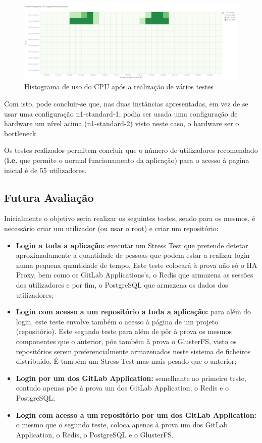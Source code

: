 \documentclass{article}
\begin{document}
\begin{figure}[H]
    \centering
    \includegraphics[width=15cm]{histCPU.png}
    \caption{Histograma de uso do CPU após a realização de vários testes}
\end{figure}

Com isto, pode concluir-se que, nas duas instâncias apresentadas, em vez de se usar uma configuração n1-standard-1, podia ser usada uma configuração de hardware um nível acima (n1-standard-2) visto neste caso, o hardware ser o bottleneck.

Os testes realizados permitem concluir que o número de utilizadores recomendado (\textbf{i.e.} que permite o normal funcionamento da aplicação) para o acesso à pagina inicial é de 55 utilizadores.

\subsection{Futura Avaliação}
Inicialmente o objetivo seria realizar os seguintes testes, sendo para os mesmos, é necessário criar um utilizador (ou usar o root) e criar um repositório:
\begin{itemize}
    \item \textbf{Login a toda a aplicação:} executar um Stress Test que pretende detetar aproximadamente a quantidade de pessoas que podem estar a realizar login numa pequena quantidade de tempo. Este teste colocará à prova não só o HA Proxy, bem como os GitLab Applications's, o Redis que armazena as sessões dos utilizadores e por fim, o PostgreSQL que armazena os dados dos utilizadores;
    \item \textbf{Login com acesso a um repositório a toda a aplicação:} para além do login, este teste envolve também o acesso à página de um projeto (repositório). Este segundo teste para além de pôr à prova os mesmos componentes que o anterior, põe também à prova o GlusterFS, visto os repositórios serem preferencialmente armazenados neste sistema de ficheiros distribuído. É também um Stress Test mas mais pesado que o anterior;
    \item \textbf{Login por um dos GitLab Application:} semelhante ao primeiro teste, contudo apenas põe à prova um dos GitLab Application, o Redis e o PostgreSQL;
    \item \textbf{Login com acesso a um repositório por um dos GitLab Application:} o mesmo que o segundo teste, coloca apenas à prova um dos GitLab Application, o Redis, o PostgreSQL e o GlusterFS.
\end{itemize}
\end{document}
